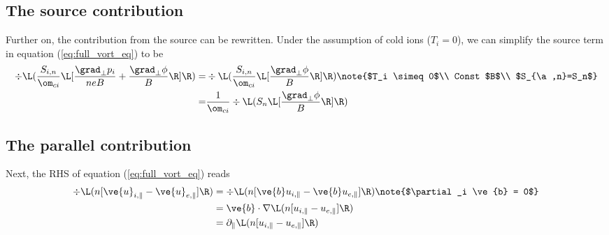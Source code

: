 \subsection{The source contribution}
Further on, the contribution from the source can be rewritten.  Under the
assumption of cold ions ($T_i = 0$), we can simplify the source term in
equation (\ref{eq:full_vort_eq}) to be
%
\begin{align*}
    \div \L( \frac{ S_{i,n}}{\om_{ci}}
      \L[ \frac{\grad_\perp p_i}{n e B} + \frac{\grad_\perp \phi}{B} \R]
    \R)
    =&
    \div \L( \frac{ S_{i,n}}{\om_{ci}} \L[ \frac{\grad_\perp \phi}{B} \R] \R)
    \note{$T_i \simeq 0$\\ Const $B$\\ $S_{\a,n}=S_n$}
    \\
%
%
    =&
    \frac{1}{\om_{ci}} \div \L( S_n \L[ \frac{ \grad_\perp \phi }{ B } \R] \R)
\end{align*}
%

\subsection{The parallel contribution}
%
Next, the RHS of equation (\ref{eq:full_vort_eq}) reads
%
\begin{align*}
    \div \L(n [\ve{u}_{i,\|} - \ve{u}_{e,\|}]\R)
    &=
    \div \L(n [\ve{b}u_{i,\|} - \ve{b}u_{e,\|}]\R)
    \note{$\partial_i \ve{b} = 0$}
    \\
    &=
    \ve{b}\cdot\nabla \L(n [u_{i,\|} - u_{e,\|}]\R)
    \\
    &=
    \partial_\| \L(n [u_{i,\|} - u_{e,\|}]\R)
\end{align*}
%

